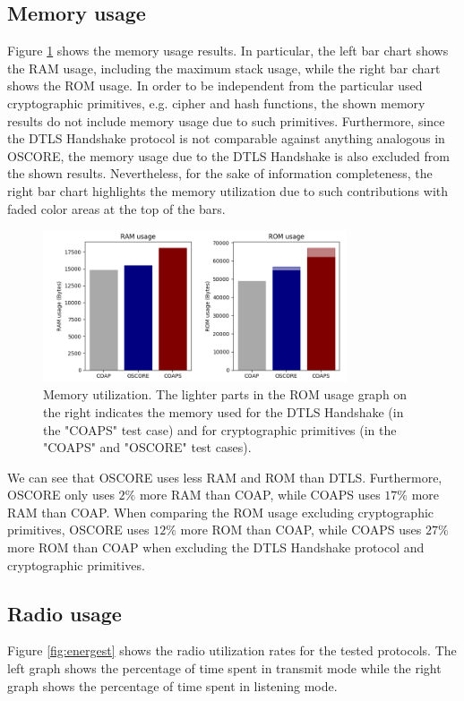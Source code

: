{\subsection{Memory usage}
Figure \ref{fig:memory} shows the memory usage results. In particular, the left bar chart shows the RAM usage, including the maximum stack usage, while the right bar chart shows the ROM usage. In order to be independent from the particular used cryptographic primitives, e.g. cipher and hash functions, the shown memory results do not include memory usage due to such primitives. Furthermore, since the DTLS Handshake protocol is not comparable against anything analogous in OSCORE, the memory usage due to the DTLS Handshake is also excluded from the shown results. Nevertheless, for the sake of information completeness, the right bar chart highlights the memory utilization due to such contributions with faded color areas at the top of the bars.

\begin{figure}[ht]
\centering
\includegraphics[width=0.8\textwidth]{papers/oscore/images/memory.png}
\caption[Memory utilization]{Memory utilization. The lighter parts in the ROM usage graph on the right indicates the memory used for the DTLS Handshake (in the "COAPS" test case) and for cryptographic primitives (in the "COAPS" and "OSCORE" test cases).}
\label{fig:memory}
\end{figure}

We can see that OSCORE uses less RAM and ROM than DTLS. Furthermore, OSCORE only uses $2\%$ more RAM than COAP, while COAPS uses $17\%$ more RAM than COAP. When comparing the ROM usage excluding cryptographic primitives, OSCORE uses $12\%$ more ROM than COAP, while COAPS uses $27\%$ more ROM than COAP when excluding the DTLS Handshake protocol and cryptographic primitives.

\subsection{Radio usage}
Figure \ref{fig:energest} shows the radio utilization rates for the tested protocols. The left graph shows the percentage of time spent in transmit mode while the right graph shows the percentage of time spent in listening mode. 

}
